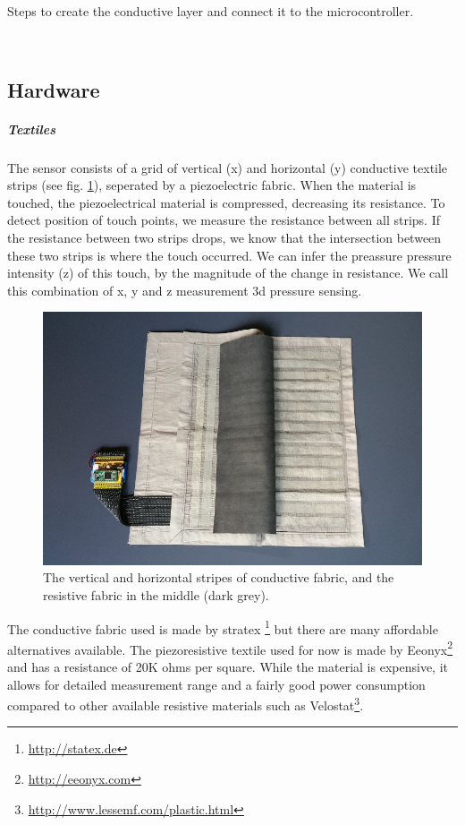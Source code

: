 \documentclass{sigchi-ext}
\begin{document}
\begin{marginfigure}[-39ex]
\begin{minipage}{\marginparwidth}
    \caption{Steps to create the conductive layer and connect it to the microcontroller.}~\label{fig:tutorial}
  \end{minipage}
\end{marginfigure}

\subsection{Hardware}
\subparagraph{Textiles}
The sensor consists of a grid of vertical (x) and horizontal (y) conductive textile strips (see fig. \ref{fig:inside}), seperated by a piezoelectric fabric. When the material is touched, the piezoelectrical material is compressed, decreasing its resistance.
To detect position of touch points, we measure the resistance between all strips. If the resistance between two strips drops, we know that the intersection between these two strips is where the touch occurred. We can infer the preassure pressure intensity (z) of this touch, by the magnitude of the change in resistance. We call this combination of x, y and z measurement 3d pressure sensing.

\begin{figure}[!h]
    \centering
    \includegraphics[width=\columnwidth]{figures/inside}
    \caption{The vertical and horizontal stripes of conductive fabric,
    and the resistive fabric in the middle (dark grey).}\label{fig:inside}
\end{figure}

The conductive fabric used is made by stratex \footnote{\url{http://statex.de}} but there are many affordable alternatives available.
The piezoresistive textile used for now is made by Eeonyx\footnote{\url{http://eeonyx.com}} and has a resistance of 20K ohms per square. While the material is expensive, it allows for detailed measurement range and a fairly good power consumption compared to other available resistive materials such as Velostat\footnote{\url{http://www.lessemf.com/plastic.html}}.
\end{document}
